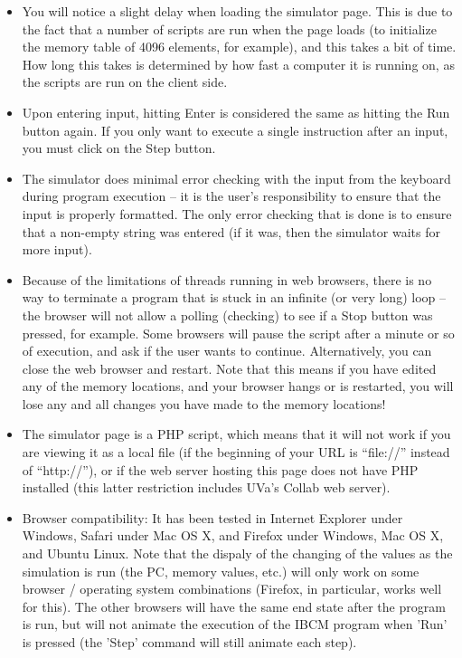 \begin{itemize}

\item You will notice a slight delay when loading the simulator page.
  This is due to the fact that a number of scripts are run when the
  page loads (to initialize the memory table of 4096 elements, for
  example), and this takes a bit of time. How long this takes is
  determined by how fast a computer it is running on, as the scripts
  are run on the client side.

\item Upon entering input, hitting Enter is considered the same as
  hitting the Run button again. If you only want to execute a single
  instruction after an input, you must click on the Step button.

\item The simulator does minimal error checking with the input from
  the keyboard during program execution -- it is the user's
  responsibility to ensure that the input is properly formatted. The
  only error checking that is done is to ensure that a non-empty
  string was entered (if it was, then the simulator waits for more
  input).

\item Because of the limitations of threads running in web browsers,
  there is no way to terminate a program that is stuck in an infinite
  (or very long) loop -- the browser will not allow a polling
  (checking) to see if a Stop button was pressed, for example. Some
  browsers will pause the script after a minute or so of execution,
  and ask if the user wants to continue. Alternatively, you can close
  the web browser and restart. Note that this means if you have edited
  any of the memory locations, and your browser hangs or is restarted,
  you will lose any and all changes you have made to the memory
  locations!

\item The simulator page is a PHP script, which means that it will not
  work if you are viewing it as a local file (if the beginning of your
  URL is ``file://'' instead of ``http://''), or if the web server
  hosting this page does not have PHP installed (this latter
  restriction includes UVa's Collab web server).

\item Browser compatibility: It has been tested in Internet Explorer
  under Windows, Safari under Mac OS X, and Firefox under Windows, Mac
  OS X, and Ubuntu Linux. Note that the dispaly of the changing of the
  values as the simulation is run (the PC, memory values, etc.) will
  only work on some browser / operating system combinations (Firefox,
  in particular, works well for this). The other browsers will have
  the same end state after the program is run, but will not animate
  the execution of the IBCM program when 'Run' is pressed (the 'Step'
  command will still animate each step).


\end{itemize}
